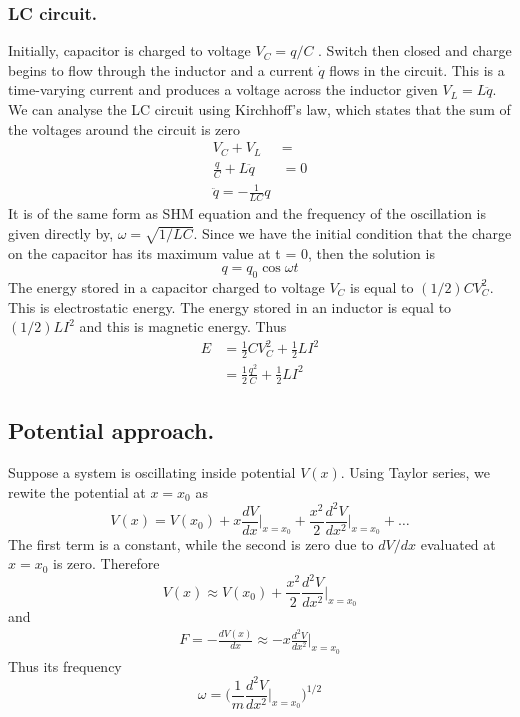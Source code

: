 \documentclass[../../../main.tex]{subfiles}
\begin{document}
\subsubsection{LC circuit.} Initially, capacitor is charged to voltage $V_C=q/C$ . Switch then closed and  charge begins to flow through the inductor and a current $\dot{q}$ flows in the circuit. This is a time-varying current and produces a voltage across the inductor given $V_L=L\ddot{q}$. We can analyse the LC circuit using Kirchhoff's law, which states that the sum of the voltages around the circuit is zero
\begin{align*}
    V_C+V_L&=\\
    \frac{q}{C}+L\ddot{q}&=0\\
    \ddot{q}=-\frac{1}{LC}q
\end{align*}
It is of the same form as SHM equation and the frequency of the oscillation is given directly by, $\omega = \sqrt{1/LC}$. Since we have the initial condition that the charge on the capacitor has its maximum value at t = 0, then the solution is
\begin{equation*}
    q=q_0\cos\omega t
\end{equation*}
The energy stored in a capacitor charged to voltage $V_C$ is equal to $(1/2) CV_C^2$. This is electrostatic energy. The energy stored in an inductor is equal to $(1/2) LI^2$ and this is magnetic energy. Thus \begin{align*}
    E&=\frac{1}{2}CV_C^2+\frac{1}{2}LI^2\\
    &=\frac{1}{2}\frac{q^2}{C}+\frac{1}{2}LI^2
\end{align*}

\subsection{Potential approach.} Suppose a system is oscillating inside potential $V(x)$. Using Taylor series, we rewite the potential at $x=x_0$ as
\begin{equation*}
    V(x)=V(x_0)+x\frac{dV}{dx}\bigg|_{x=x_0}+\frac{x^2}{2}\frac{d^2V}{dx^2}\bigg|_{x=x_0}+\dots
\end{equation*}
The first term is a constant, while the second is zero due to $dV/dx$ evaluated at $x=x_0$ is zero. Therefore 
\begin{equation*}
    V(x)\approx V(x_0)+\frac{x^2}{2}\frac{d^2V}{dx^2}\bigg|_{x=x_0}
\end{equation*}
and 
\begin{align*}
    F=-\frac{dV(x)}{dx}\approx-x\frac{d^2V}{dx^2}\bigg|_{x=x_0}
\end{align*}
Thus its frequency
\begin{equation*}
    \omega=\biggl(\frac{1}{m}\frac{d^2V}{dx^2}\bigg|_{x=x_0}\biggr)^{1/2}
\end{equation*} 
\end{document}
